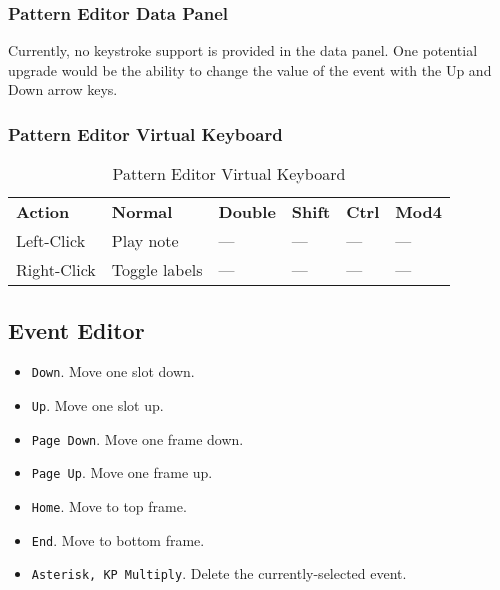 \subsubsection{Pattern Editor Data Panel}
\label{subsubsec:kbd_mouse_pattern_editor_data_panel}

   Currently, no keystroke support is provided in the data panel.
   One potential upgrade would be the ability to change the value of the event
   with the Up and Down arrow keys.

\subsubsection{Pattern Editor Virtual Keyboard}
\label{subsubsec:kbd_mouse_pattern_editor_virtual_keyboard}

   \begin{table}[H]
      \centering
      \caption{Pattern Editor Virtual Keyboard}
      \label{table:pattern_editor_virtual_keyboard}
      \begin{tabular}{l l l l l l}
         \textbf{Action}   & \textbf{Normal} & \textbf{Double}    & \textbf{Shift} & \textbf{Ctrl}   & \textbf{Mod4}      \\
         Left-Click        & Play note       & ---                & ---            & ---             & ---                \\
         Right-Click       & Toggle labels   & ---                & ---            & ---             & ---                \\
      \end{tabular}
   \end{table}

\subsection{Event Editor}
\label{subsec:kbd_mouse_event_editor}

   \begin{itemize}
      \item \texttt{Down}.  Move one slot down.
      \item \texttt{Up}.  Move one slot up.
      \item \texttt{Page Down}.  Move one frame down.
      \item \texttt{Page Up}.  Move one frame up.
      \item \texttt{Home}.  Move to top frame.
      \item \texttt{End}.  Move to bottom frame.
      \item \texttt{Asterisk, KP Multiply}.  Delete the currently-selected event.
   \end{itemize}

